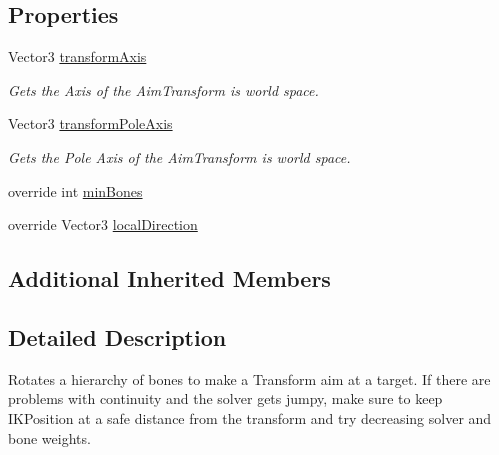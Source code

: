 \subsection*{Properties}
\begin{DoxyCompactItemize}
\item 
Vector3 \mbox{\hyperlink{class_root_motion_1_1_final_i_k_1_1_i_k_solver_aim_ada13db8445b9222b2bc50d7427c8fe2d}{transform\+Axis}}
\begin{DoxyCompactList}\small\item\em Gets the Axis of the Aim\+Transform is world space. \end{DoxyCompactList}\item 
Vector3 \mbox{\hyperlink{class_root_motion_1_1_final_i_k_1_1_i_k_solver_aim_a2131a40de8820e5f02dddfa4dc6305f2}{transform\+Pole\+Axis}}
\begin{DoxyCompactList}\small\item\em Gets the Pole Axis of the Aim\+Transform is world space. \end{DoxyCompactList}\item 
override int \mbox{\hyperlink{class_root_motion_1_1_final_i_k_1_1_i_k_solver_aim_a0dc837dae42f3d9f9a7e1fcc19a8df20}{min\+Bones}}
\item 
override Vector3 \mbox{\hyperlink{class_root_motion_1_1_final_i_k_1_1_i_k_solver_aim_aea84fc8bfd53afc1070e0dd1f9b8148a}{local\+Direction}}
\end{DoxyCompactItemize}
\subsection*{Additional Inherited Members}


\subsection{Detailed Description}
Rotates a hierarchy of bones to make a Transform aim at a target. If there are problems with continuity and the solver get\textquotesingle{}s jumpy, make sure to keep I\+K\+Position at a safe distance from the transform and try decreasing solver and bone weights. 



